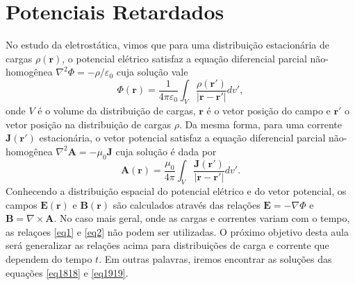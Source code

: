 \documentclass{article}
\begin{document}
\section{Potenciais Retardados}

No estudo da eletrostática, vimos que para uma distribuição estacionária de cargas $\rho(\mathbf{r})$, o potencial elétrico satisfaz a equação diferencial parcial não-homogênea $\nabla^2 \Phi = -\rho/\varepsilon_0$ cuja solução vale
\begin{equation}
    \Phi(\mathbf{r}) = \frac{1}{4\pi\varepsilon_0}\int_{V}\frac{\rho(\mathbf{r}')}{|\mathbf{r} - \mathbf{r}'|}dv',
    \label{eq1}
\end{equation}
onde $V$ é o volume da distribuição de cargas, $\mathbf{r}$ é o vetor posição do campo e $\mathbf{r}'$ o vetor posição na distribuição de cargas $\rho$. Da mesma forma, para uma corrente $\mathbf{J}(\mathbf{r}')$ estacionária, o vetor potencial satisfaz a equação diferencial parcial não-homogênea $\nabla^2 \mathbf{A} =  -\mu_0 \mathbf{J}$ cuja solução é dada por 
\begin{equation}
    \mathbf{A}(\mathbf{r}) = \frac{\mu_{0}}{4\pi}\int_{V}\frac{\mathbf{J}(\mathbf{r}')}{|\mathbf{r} - \mathbf{r}'|}dv'.
    \label{eq2}    
\end{equation}
Conhecendo a distribuição espacial do potencial elétrico e do vetor potencial, os campos $\mathbf{E}(\mathbf{r})$ e $\mathbf{B}(\mathbf{r})$ são calculados através das relações $\mathbf{E} = -\nabla\Phi$ e $\mathbf{B} = \nabla\times\mathbf{A}$. No caso mais geral, onde as cargas e correntes variam com o tempo, as relaçoes \eqref{eq1} e \eqref{eq2} não podem ser utilizadas. O próximo objetivo desta aula será generalizar as relações acima para distribuições de carga e corrente que dependem do tempo $t$. Em outras palavras, iremos encontrar as soluções das equações \eqref{eq1818} e \eqref{eq1919}.
\end{document}
